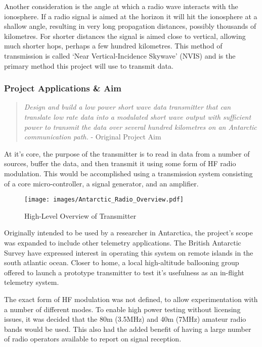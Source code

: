 \documentclass[a4paper,12pt]{article}
\begin{document}
Another consideration is the angle at which a radio wave interacts with the ionosphere. If a radio signal is aimed at the horizon it will hit the ionosphere at a shallow angle, resulting in very long propagation distances, possibly thousands of kilometres. For shorter distances the signal is aimed close to vertical, allowing much shorter hops, perhaps a few hundred kilometres. This method of transmission is called `Near Vertical-Incidence Skywave' (NVIS) and is the primary method this project will use to transmit data.

\subsubsection*{Project Applications \& Aim}

\begin{quote}
\textit{
Design and build a low power short wave data transmitter that can translate low rate data into a modulated short wave output with sufficient power to transmit the data over several hundred kilometres on an Antarctic communication path.}
- Original Project Aim
\end{quote}

At it's core, the purpose of the transmitter is to read in data from a number of sources, buffer the data, and then transmit it using some form of HF radio modulation. This would be accomplished using a transmission system consisting of a core micro-controller, a signal generator, and an amplifier.

\begin{figure}[h]
  \begin{center}
    \texttt{[image: images/Antarctic\_Radio\_Overview.pdf]}
  \end{center}
  \caption{High-Level Overview of Transmitter}
  \label{fig:high_level}
\end{figure}

Originally intended to be used by a researcher in Antarctica, the project's scope was expanded to include other telemetry applications. The British Antarctic Survey have expressed interest in operating this system on remote islands in the south atlantic ocean. Closer to home, a local high-altitude ballooning group offered to launch a prototype transmitter to test it's usefulness as an in-flight telemetry system.

 

The exact form of HF modulation was not defined, to allow experimentation with a number of different modes. To enable high power testing without licensing issues, it was decided that the 80m (3.5MHz) and 40m (7MHz) amateur radio bands would be used. This also had the added benefit of having a large number of radio operators available to report on signal reception.
\end{document}
